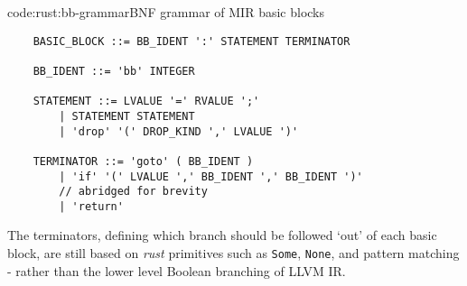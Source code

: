 \begin{codelisting}{code:rust:bb-grammar}{BNF grammar of MIR basic blocks}
\begin{spacing}{\codespacing}
\begin{verbatim}
    BASIC_BLOCK ::= BB_IDENT ':' STATEMENT TERMINATOR

    BB_IDENT ::= 'bb' INTEGER

    STATEMENT ::= LVALUE '=' RVALUE ';'
        | STATEMENT STATEMENT
        | 'drop' '(' DROP_KIND ',' LVALUE ')'

    TERMINATOR ::= 'goto' ( BB_IDENT )
        | 'if' '(' LVALUE ',' BB_IDENT ',' BB_IDENT ')'
        // abridged for brevity
        | 'return'
\end{verbatim}
\end{spacing}
\end{codelisting}

The terminators, defining which branch should be followed `out' of each basic block, are still based on \emph{rust} primitives such as \texttt{Some}, \texttt{None}, and pattern matching - rather than the lower level Boolean branching of LLVM IR. \cite{rust_intro_mir}
